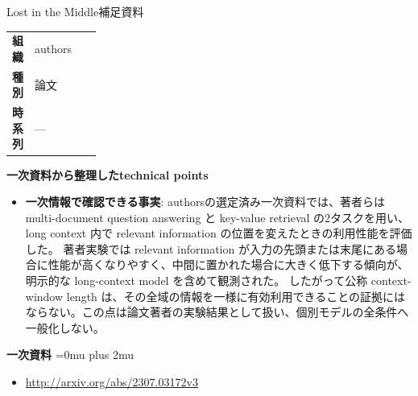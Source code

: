 \begin{technicalnote}{Lost in the Middle}{補足資料}
\begingroup
\begin{tabularx}{\linewidth}{@{}>{\bfseries}p{0.22\linewidth}X@{}}
組織 & authors \\
種別 & 論文 \\
時系列 & — \\
\end{tabularx}
\smallskip
{\bfseries 一次資料から整理したtechnical points}
\begin{itemize}[leftmargin=1.5em,itemsep=0.35em]
\item \textbf{一次情報で確認できる事実}: authorsの選定済み一次資料では、著者らは multi-document question answering と key-value retrieval の2タスクを用い、long context 内で relevant information の位置を変えたときの利用性能を評価した。 著者実験では relevant information が入力の先頭または末尾にある場合に性能が高くなりやすく、中間に置かれた場合に大きく低下する傾向が、明示的な long-context model を含めて観測された。 したがって公称 context-window length は、その全域の情報を一様に有効利用できることの証拠にはならない。この点は論文著者の実験結果として扱い、個別モデルの全条件へ一般化しない。
\end{itemize}
\begin{minipage}{\linewidth}
\begin{samepage}
{\bfseries 一次資料}
\begingroup\sloppy
\Urlmuskip=0mu plus 2mu\relax
\begin{itemize}[leftmargin=1.5em,itemsep=0.25em]
\item {\scriptsize\url{http://arxiv.org/abs/2307.03172v3}}
\end{itemize}
\endgroup
\end{samepage}
\end{minipage}
\endgroup
\end{technicalnote}
\medskip
